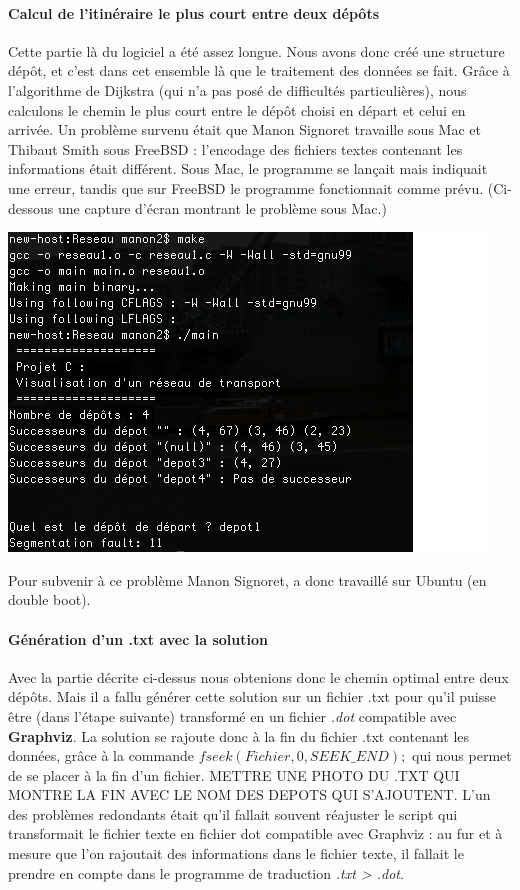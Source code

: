 \documentclass[12pt,a4paper]{report}
\begin{document}
\paragraph{Calcul de l'itinéraire le plus court entre deux dépôts}
Cette partie là du logiciel a été assez longue. Nous avons donc créé une structure dépôt, et c'est dans cet ensemble là que le traitement des données se fait. Grâce à l'algorithme de Dijkstra (qui n'a pas posé de difficultés particulières), nous calculons le chemin le plus court entre le dépôt choisi en départ et celui en arrivée. Un problème survenu était que Manon Signoret travaille sous Mac et Thibaut Smith sous FreeBSD : l'encodage des fichiers textes contenant les informations était différent. Sous Mac, le programme se lançait mais indiquait une erreur, tandis que sur FreeBSD le programme fonctionnait comme prévu. (Ci-dessous une capture d'écran montrant le problème sous Mac.)
\begin{center}
\includegraphics[scale=0.6]{capture1.png}
\end{center}
Pour subvenir à ce problème Manon Signoret, a donc travaillé sur Ubuntu (en double boot).

\paragraph{Génération d'un .txt avec la solution}
Avec la partie décrite ci-dessus nous obtenions donc le chemin optimal entre deux dépôts. Mais il a fallu générer cette solution sur un fichier .txt pour qu'il puisse être (dans l'étape suivante) transformé en un fichier \textit{.dot} compatible avec \textbf{Graphviz}. La solution se rajoute donc à la fin du fichier .txt contenant les données, grâce à la commande \textit{$fseek(Fichier, 0, SEEK\_END);$} qui nous permet de se placer à la fin d'un fichier. METTRE UNE PHOTO DU .TXT QUI MONTRE LA FIN AVEC LE NOM DES DEPOTS QUI S'AJOUTENT. L'un des problèmes redondants était qu'il fallait souvent réajuster le script qui transformait le fichier texte en fichier dot compatible avec Graphviz : au fur et à mesure que l'on rajoutait des informations dans le fichier texte, il fallait le prendre en compte dans le programme de traduction \textit{.txt > .dot}.
\end{document}
